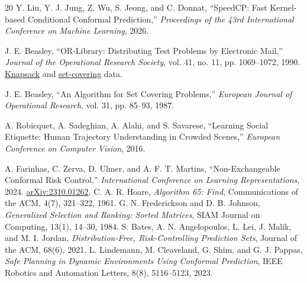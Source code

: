\documentclass[a4paper,10pt]{article}
\theoremstyle{plain}
\theoremstyle{remark}
\begin{document}
\begin{thebibliography}{20}
 Y. Liu, Y. J. Jung, Z. Wu, S. Jeong, and C. Donnat,
``SpeedCP: Fast Kernel-based Conditional Conformal Prediction,''
\emph{Proceedings of the 43rd International Conference on Machine Learning},
2026.

 J. E. Beasley, ``OR-Library: Distributing Test Problems by
Electronic Mail,'' \emph{Journal of the Operational Research Society},
vol. 41, no. 11, pp. 1069--1072, 1990.
\href{https://people.brunel.ac.uk/~mastjjb/jeb/orlib/mknapinfo.html}{Knapsack}
and \href{https://people.brunel.ac.uk/~mastjjb/jeb/orlib/scpinfo.html}{set-covering} data.

 J. E. Beasley, ``An Algorithm for Set Covering Problems,''
\emph{European Journal of Operational Research}, vol. 31, pp. 85--93, 1987.

 A. Robicquet, A. Sadeghian, A. Alahi, and S. Savarese,
``Learning Social Etiquette: Human Trajectory Understanding in Crowded
Scenes,'' \emph{European Conference on Computer Vision}, 2016.

 A. Farinhas, C. Zerva, D. Ulmer, and
A. F. T. Martins, ``Non-Exchangeable Conformal Risk Control,''
\emph{International Conference on Learning Representations}, 2024.
\href{https://arxiv.org/abs/2310.01262}{arXiv:2310.01262}.
 C. A. R. Hoare, \emph{Algorithm 65: Find}, Communications of the ACM, 4(7), 321--322, 1961.
 G. N. Frederickson and D. B. Johnson, \emph{Generalized Selection and Ranking: Sorted Matrices}, SIAM Journal on Computing, 13(1), 14--30, 1984.
 S. Bates, A. N. Angelopoulos, L. Lei, J. Malik, and M. I. Jordan, \emph{Distribution-Free, Risk-Controlling Prediction Sets}, Journal of the ACM, 68(6), 2021.
 L. Lindemann, M. Cleaveland, G. Shim, and G. J. Pappas, \emph{Safe Planning in Dynamic Environments Using Conformal Prediction}, IEEE Robotics and Automation Letters, 8(8), 5116--5123, 2023.

\end{thebibliography}
\end{document}
